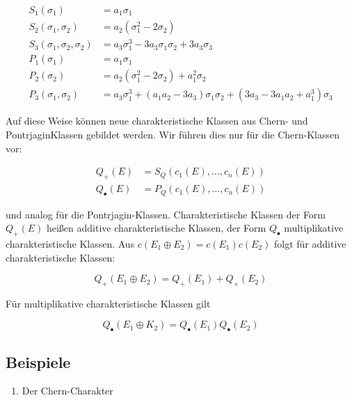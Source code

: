 \documentclass[10pt, letterpaper]{article}
\begin{document}
$$
\begin{aligned}
S_{1}\left(\sigma_{1}\right) & =a_{1} \sigma_{1} \\
S_{2}\left(\sigma_{1}, \sigma_{2}\right) & =a_{2}\left(\sigma_{1}^{2}-2 \sigma_{2}\right) \\
S_{3}\left(\sigma_{1}, \sigma_{2}, \sigma_{2}\right) & =a_{3} \sigma_{1}^{3}-3 a_{3} \sigma_{1} \sigma_{2}+3 a_{3} \sigma_{3} \\
P_{1}\left(\sigma_{1}\right) & =a_{1} \sigma_{1} \\
P_{2}\left(\sigma_{2}\right) & =a_{2}\left(\sigma_{1}^{2}-2 \sigma_{2}\right)+a_{1}^{2} \sigma_{2} \\
P_{3}\left(\sigma_{1}, \sigma_{2}\right) & =a_{3} \sigma_{1}^{3}+\left(a_{1} a_{2}-3 a_{3}\right) \sigma_{1} \sigma_{2}+\left(3 a_{3}-3 a_{1} a_{2}+a_{1}^{3}\right) \sigma_{3}
\end{aligned}
$$

Auf diese Weise können neue charakteristische Klassen aus Chern- und PontrjaginKlassen gebildet werden. Wir führen dies nur für die Chern-Klassen vor:

$$
\begin{aligned}
Q_{+}(E) & =S_{Q}\left(c_{1}(E), \ldots, c_{n}(E)\right) \\
Q_{\bullet}(E) & =P_{Q}\left(c_{1}(E), \ldots, c_{n}(E)\right)
\end{aligned}
$$

und analog für die Pontrjagin-Klassen. Charakteristische Klassen der Form $Q_{+}(E)$ heißen additive charakteristische Klassen, der Form $Q_{\bullet}$ multiplikative charakteristische Klassen. Aus $c\left(E_{1} \oplus E_{2}\right)=c\left(E_{1}\right) c\left(E_{2}\right)$ folgt für additive charakteristische Klassen:

$$
Q_{+}\left(E_{1} \oplus E_{2}\right)=Q_{+}\left(E_{1}\right)+Q_{+}\left(E_{2}\right)
$$

Für multiplikative charakteristische Klassen gilt

$$
Q_{\bullet}\left(E_{1} \oplus K_{2}\right)=Q_{\bullet}\left(E_{1}\right) Q_{\bullet}\left(E_{2}\right)
$$

\subsection*{Beispiele}
\begin{enumerate}
  \item Der Chern-Charakter
\end{enumerate}
\end{document}
